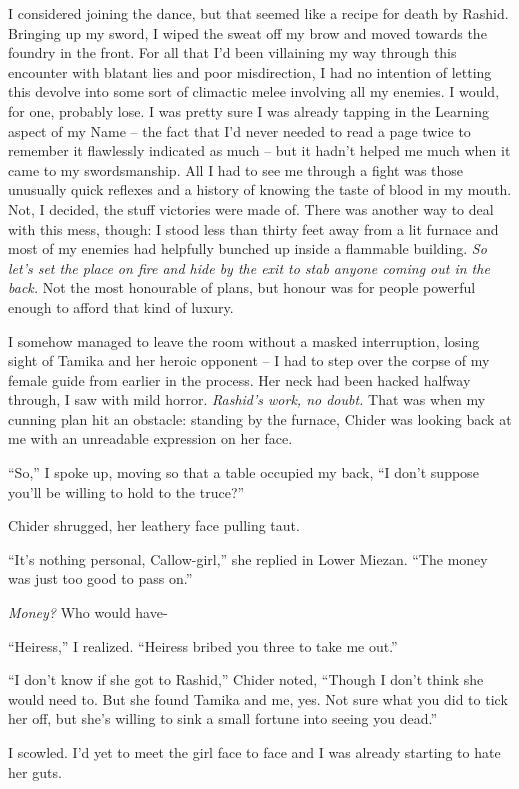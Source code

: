 \documentclass[12pt, openany]{book}
\begin{document}
I considered joining the dance, but that seemed like a recipe for death by Rashid. Bringing up my sword, I wiped the sweat off my brow and moved towards the foundry in the front. For all that I’d been villaining my way through this encounter with blatant lies and poor misdirection, I had no intention of letting this devolve into some sort of climactic melee involving all my enemies. I would, for one, probably lose. I was pretty sure I was already tapping in the Learning aspect of my Name – the fact that I’d never needed to read a page twice to remember it flawlessly indicated as much – but it hadn’t helped me much when it came to my swordsmanship. All I had to see me through a fight was those unusually quick reflexes and a history of knowing the taste of blood in my mouth. Not, I decided, the stuff victories were made of. There was another way to deal with this mess, though: I stood less than thirty feet away from a lit furnace and most of my enemies had helpfully bunched up inside a flammable building. \textit{So let’s set the place on fire and hide by the exit to stab anyone coming out in the back. }Not the most honourable of plans, but honour was for people powerful enough to afford that kind of luxury.

I somehow managed to leave the room without a masked interruption, losing sight of Tamika and her heroic opponent – I had to step over the corpse of my female guide from earlier in the process. Her neck had been hacked halfway through, I saw with mild horror. \textit{Rashid’s work, no doubt.} That was when my cunning plan hit an obstacle: standing by the furnace, Chider was looking back at me with an unreadable expression on her face.

“So,” I spoke up, moving so that a table occupied my back, “I don’t suppose you’ll be willing to hold to the truce?”

Chider shrugged, her leathery face pulling taut.

“It’s nothing personal, Callow-girl,” she replied in Lower Miezan. “The money was just too good to pass on.”

\textit{Money?} Who would have-

“Heiress,” I realized. “Heiress bribed you three to take me out.”

“I don’t know if she got to Rashid,” Chider noted, “Though I don’t think she would need to. But she found Tamika and me, yes. Not sure what you did to tick her off, but she’s willing to sink a small fortune into seeing you dead.”

I scowled. I’d yet to meet the girl face to face and I was already starting to hate her guts.
\end{document}
